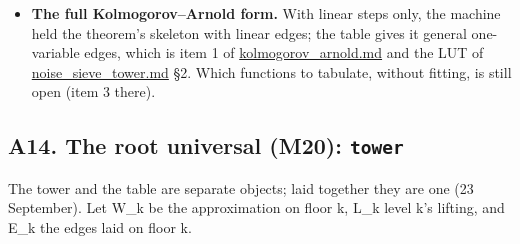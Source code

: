 \begin{itemize}
\begin{itemize}
\item \textbf{Proved} (\texttt{knf\_\allowbreak{}identity}, 23 checks, 0 failed, e4eae72): the knf of the nbody lattice (64³, 177 frames) against spatial null permutations. The host's walk equals the engine's knf at every voxel, and a single flipped bit leaves it unchanged exactly where the window rule says (1,500 of 8,192): the knf is many-to-one. The 48 exact cube motions carry the knf and keep its entangled entropy E and its cloud. The whole is its tiles plus its seams at every tile size. Alike-voxel controls are identified within 5σ of 1/20. \textbf{Measured:} E is 44.6 times the free null's mean, the inside and between departure curves cross between tiles of 2 and 4 and sum to 0.590 at 4, and each body's box has its own curve. Written in \hyperref[chap:two-crystals]{two\_\allowbreak{}crystals.md}.
\end{itemize}
\item \textbf{The full Kolmogorov–Arnold form.} With linear steps only, the machine held the theorem's skeleton with linear edges; the table gives it general one-variable edges, which is item 1 of \hyperref[chap:kolmogorov-arnold]{kolmogorov\_\allowbreak{}arnold.md} and the LUT of \hyperref[chap:noise-sieve-tower]{noise\_\allowbreak{}sieve\_\allowbreak{}tower.md} §2. Which functions to tabulate, without fitting, is still open (item 3 there).
\end{itemize}

\subsection{\texorpdfstring{A14. The root universal (M20): \texttt{tower}}{A14. The root universal (M20): tower}}

The tower and the table are separate objects; laid together they are one (23 September). Let W\_\allowbreak{}k be the approximation on floor k, L\_\allowbreak{}k level k's lifting, and E\_\allowbreak{}k the edges laid on floor k.


